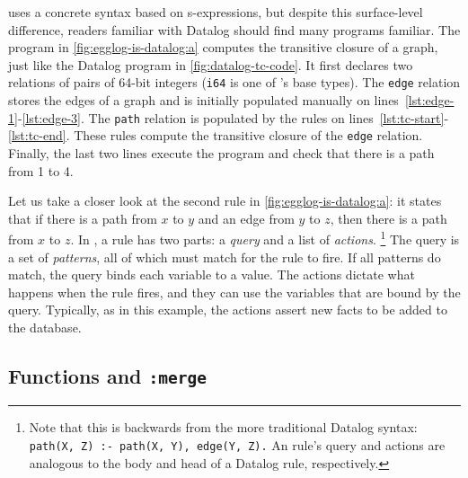 \Egglog uses a concrete syntax based on s-expressions,
 but despite this surface-level difference,
 readers familiar with Datalog should find many 
 \egglog programs familiar.
The program in \autoref{fig:egglog-is-datalog:a}
 computes the transitive closure of a graph,
 just like the Datalog program in \autoref{fig:datalog-tc-code}.
It first declares two relations of pairs of 64-bit integers 
 (\lstinline{i64} is one of \egglog's base types).
The \lstinline{edge} relation stores the edges of a graph 
 and is initially populated manually on lines~\ref{lst:edge-1}-\ref{lst:edge-3}.
The \lstinline{path} relation is populated by the rules on lines~\ref{lst:tc-start}-\ref{lst:tc-end}.
These rules compute the transitive closure of the \lstinline{edge} relation.
Finally, the last two lines execute the program and check that 
 there is a path from 1 to 4.

Let us take a closer look at the second rule in \autoref{fig:egglog-is-datalog:a}:
 it states that if there is a path from $x$ to $y$ 
 and an edge from $y$ to $z$, 
 then there is a path from $x$ to $z$.
In \egglog, a rule has two parts: 
 a \emph{query} and a list of \emph{actions}.%
\footnote{
Note that this is backwards from the
 more traditional Datalog syntax:
 \lstinline{path(X, Z) :- path(X, Y), edge(Y, Z).}
An \egglog rule's query and actions are analogous 
 to the body and head of a Datalog rule, respectively.
}
The query is a set of \emph{patterns},
 all of which must match for the rule to fire.
If all patterns do match, the query binds each variable to a value.
The actions dictate what happens when the rule fires,
 and they can use the variables that are bound by the query.
Typically, as in this example, the actions assert
 new facts to be added to the database.


\subsection{Functions and \lstinline{:merge}}
\label{sec:merge}

